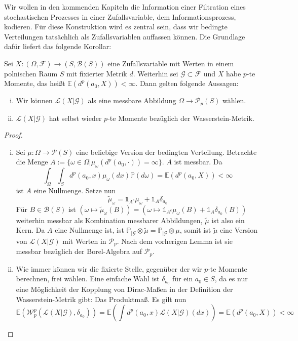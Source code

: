 Wir wollen in den kommenden Kapiteln die Information einer Filtration eines stochastischen Prozesses in einer Zufallsvariable, dem Informationsprozess, kodieren. Für diese Konstruktion wird es zentral sein, dass wir bedingte Verteilungen tatsächlich als Zufallsvariablen auffassen können. Die Grundlage dafür liefert das folgende Korollar:
\begin{corollary}\label{thm:pmoments}
    Sei $X:(\Omega, \mathcal{F})\rightarrow(S, \mathcal{B}(S))$ eine Zufallsvariable mit Werten in einem polnischen Raum $S$ mit fixierter Metrik $d$. Weiterhin sei $\mathcal{G}\subset \mathcal{F}$ und $X$ habe $p$-te Momente, das heißt $\mathbb{E}(d^p(a_0, X))<\infty$. Dann gelten folgende Aussagen:
    \begin{enumerate}[(i)]
        \item Wir können $\mathcal{L}(X\vert \mathcal{G})$ als eine messbare Abbildung $\Omega\rightarrow\mathcal{P}_p(S)$ wählen.
        \item $\mathcal{L}(X\vert \mathcal{G})$ hat selbst wieder $p$-te Momente bezüglich der Wasserstein-Metrik.
    \end{enumerate}
\end{corollary}
\begin{proof}
\begin{enumerate}[(i)]
    \item Sei $\mu:\Omega\rightarrow\mathcal{P}(S)$ eine beliebige Version der bedingten Verteilung. Betrachte die Menge $A:=\{\omega\in\Omega\vert \mu_\omega(d^p(a_0, \cdot)) = \infty\}$. $A$ ist messbar. Da 
$$\int_{\Omega}\int_{S} d^p(a_0, x)\mu_{\omega}(dx)\mathbb{P}(d\omega) = \mathbb{E}(d^p(a_0, X))<\infty$$
ist $A$ eine Nullmenge. Setze nun 
$$\tilde{\mu}_\omega=\mathds{1}_{A^c}\mu_\omega + \mathds{1}_{A}\delta_{a_0}$$
Für $B\in\mathcal{B}(S)$ ist $(\omega\mapsto\tilde{\mu}_\omega(B)) = (\omega \mapsto \mathds{1}_{A^c}\mu_\omega(B)+\mathds{1}_A \delta_{a_0}(B))$ weiterhin messbar als Kombination messbarer Abbildungen, $\tilde{\mu}$ ist also ein Kern. Da $A$ eine Nullmenge ist, ist $\mathbb{P}_{\vert \mathcal{G}}\otimes \tilde{\mu} = \mathbb{P}_{\vert\mathcal{G}} \otimes \mu$, somit ist $\tilde{\mu}$ eine Version von $\mathcal{L}(X\vert \mathcal{G})$ mit Werten in $\mathcal{P}_p$. Nach dem vorherigen Lemma ist sie messbar bezüglich der Borel-Algebra auf $\mathcal{P}_p$.
\item Wie immer können wir die fixierte Stelle, gegenüber der wir $p$-te Momente berechnen, frei wählen. Eine einfache Wahl ist $\delta_{a_0}$ für ein $a_0\in S$, da es nur eine Möglichkeit der Kopplung von Dirac-Maßen in der Definition der Wasserstein-Metrik gibt: Das Produktmaß. Es gilt nun
$$\mathbb{E}\left(\mathcal{W}_p^p\left(\mathcal{L}(X\vert\mathcal{G}), \delta_{a_0}\right)\right)=\mathbb{E}\left(\int d^p(a_0, x)\mathcal{L}(X\vert\mathcal{G})(dx)\right)=\mathbb{E}\left(d^p(a_0, X)\right) < \infty$$
\end{enumerate}
\end{proof}
